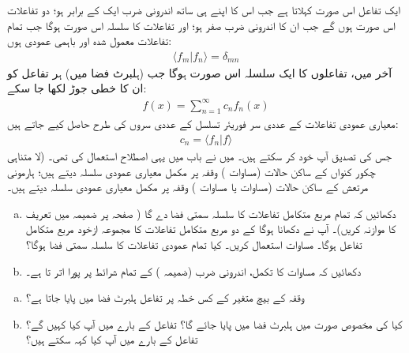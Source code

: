 ایک تفاعل اس صورت کہلاتا ہے جب اس کا اپنے ہی ساتھ اندرونی ضرب ایک  کے برابر ہو؛ دو تفاعلات اس صورت  ہوں گے جب ان کا اندرونی ضرب صفر   ہو؛  اور تفاعلات  کا سلسلہ اس صورت  ہوگا جب تمام تفاعلات  معمول شدہ اور باہمی  عمودی ہوں:
\begin{align}
	\langle f_m | f_n \rangle = \delta_{mn}
\end{align}
آخر میں،  تفاعلوں کا ایک سلسلہ اس صورت ہوگا جب (ہلبرٹ فضا میں)  ہر تفاعل کو ان کا خطی جوڑ لکھا جا سکے:
\begin{align}
	f(x) = \sum\limits_{n=1}^\infty c_{n} f_{n}(x)
\end{align}
معیاری عمودی تفاعلات       کے عددی سر فوریئر تسلسل کے عددی سروں کی طرح حاصل کیے جاتے ہیں:
\begin{align}
	c_{n} = \langle f_{n} | f \rangle
\end{align}
جس کی   تصدیق آپ خود کر سکتے ہیں۔ میں نے باب  میں یہی اصطلاح استعمال کی تھی۔ (لا متناہی چکور کنواں کے ساکن حالات  (مساوات )  وقفہ  پر مکمل معیاری عمودی سلسلہ دیتے ہیں؛  ہارمونی مرتعش کے ساکن حالات (مساوات  یا  مساوات ) وقفہ  پر مکمل معیاری عمودی سلسلہ دیتے ہیں۔

\begin{enumerate}[a.]
\item
 دکھائیں کہ تمام   مربع متکامل  تفاعلات  کا سلسلہ سمتی  فضا دے گا ( صفحہ  پر ضمیمہ  میں تعریف کا موازنہ کریں)۔   آپ نے دکھانا  ہوگا کے دو  مربع متکامل  تفاعلات کا مجموعہ ازخود مربع متکامل  تفاعل  ہوگا۔  مساوات  استعمال کریں۔ کیا تمام عمودی تفاعلات  کا سلسلہ سمتی فضا ہوگا؟
 \item
 دکھائیں  کہ مساوات  کا تکمل،  اندرونی  ضرب (ضمیمہ ) کے تمام شرائط پر پورا اتر تا ہے۔
 \end{enumerate}
\begin{enumerate}[a.]
\item
    وقفہ   کے بیچ متغیر    کے کس خطہ پر      تفاعل   ہلبرٹ فضا میں پایا جاتا ہے؟
\item
 کیا  کی مخصوص صورت میں  ہلبرٹ فضا میں پایا جائے گا؟ تفاعل    کے بارے میں آپ کیا کہیں گے؟  تفاعل  کے بارے میں آپ کیا کہہ سکتے ہیں؟
 \end{enumerate}

